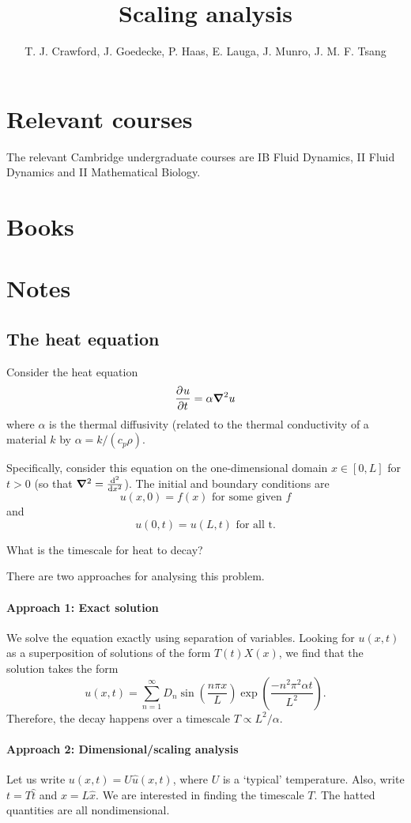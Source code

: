 \documentclass{article}
\title{Scaling analysis}
\author{T. J. Crawford, J. Goedecke, P. Haas, E. Lauga, J. Munro, J. M. F. Tsang}
\begin{document}
\maketitle

\section{Relevant courses}

The relevant Cambridge undergraduate courses are IB Fluid Dynamics, II Fluid
Dynamics and II Mathematical Biology.

\section{Books}


\section{Notes}

\subsection{The heat equation}

Consider the heat equation
$$ \dpd{u}{t} = \alpha\grad^2 u  $$
where $\alpha$ is the thermal diffusivity (related to the thermal conductivity
of a material $k$ by $\alpha = k/(c_p \rho)$. 

Specifically, consider this equation on the one-dimensional domain
$x\in[0,L]$ for $t>0$ (so that $\grad^2 = \od[2]{}{x}$). The initial and boundary conditions are 
$$ u(x,0) = f(x) \text{ for some given $f$} $$
and
$$ u(0,t) = u(L,t) \text{ for all t.} $$

What is the timescale for heat to decay? 

There are two approaches for analysing this problem.

\paragraph{Approach 1: Exact solution} We solve the equation exactly using
separation of variables. Looking for $u(x,t)$ as a superposition of solutions of
the form $T(t)X(x)$, we find that the solution takes the form 
$$ u(x,t) = \sum_{n=1}^\infty D_n \sin\left(\frac{n\pi x}{L}\right)
\exp\left(\frac{-n^2 \pi^2 \alpha t}{L^2}\right). $$
Therefore, the decay happens over a timescale $T \propto L^2/\alpha$.

\paragraph{Approach 2: Dimensional/scaling analysis} Let us write $u(x,t) = U \hat
u(x,t) $, where $U$ is a `typical' temperature. Also, write $t=T\hat{t}$ and
$x=L\hat{x}$. We are interested in finding the timescale $T$. The hatted
quantities are all nondimensional.
\end{document}
